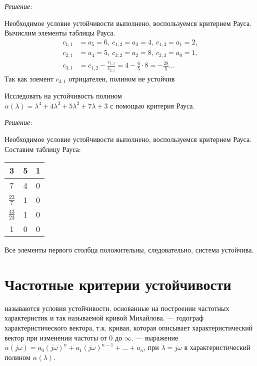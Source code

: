 \documentclass[../../TAU.tex]{subfiles}
\begin{document}
    {\it Решение:}\par
    Необходимое условие устойчивости выполнено, воспользуемся критерием Рауса. Вычислим элементы таблицы Рауса.
    \begin{align*}
        c_{1,1}&=a_5=6,\ c_{1,2}=a_3=4,\ c_{1,3}=a_1=2, \\
        c_{2,1}&=a_4=5,\ c_{2,2}=a_2=8,\ c_{2,3}=a_0=1, \\
        c_{3,1}&=c_{1,2}-\frac{c_{1,1}}{c_{2,1}}=4-\frac{6}{5}\cdot 8 = -\frac{28}{5}...
    \end{align*}
    Так как элемент $c_{3,1}$ отрицателен, полином не устойчив 


    \examp Исследовать на устойчивость полином\\
    $\alpha(\lambda) = \lambda^4+4\lambda^3+5\lambda^2+7\lambda+3$ 
    с помощью критерия Рауса.

    {\it Решение:}\par
    Необходимое условие устойчивости выполнено, воспользуемся критерием Рауса. Составим таблицу Рауса:
    \begin{center}
        \begin{tabular}[h]{|c|c|c|}
            \hline
            3 & 5 & 1 \\
            \hline
            7 & 4 & 0 \\
            \hline
            $\frac{23}{7}$ & 1 & 0 \\
            \hline
            $\frac{43}{23}$ & 1 & 0 \\
            \hline
            1 & 0 & 0 \\
            \hline
        \end{tabular}
    \end{center}
    Все элементы первого столбца положительны, следовательно, система устойчива.

\section{Частотные критерии устойчивости}

     называются условия устойчивости, основанные на построении частотных характеристик и так называемой кривой Михайлова.
     --- годограф характеристического вектора, т.к. кривая, которая описывает характеристический вектор при изменении частоты от $0$ до $\infty$.
     --- выражение 
    $\alpha(j \omega)=a_0(j \omega)^n+a_1(j \omega)^{n-1}+...+a_n$, при $\lambda=j \omega$ в характеристический полином $\alpha(\lambda)$.
\end{document}

